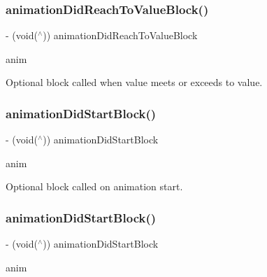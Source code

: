 \subsubsection{\texorpdfstring{animation\+Did\+Reach\+To\+Value\+Block()}{animationDidReachToValueBlock()}\hspace{0.1cm}{\footnotesize\ttfamily [2/2]}}
{\footnotesize\ttfamily -\/ (void($^\wedge$)) animation\+Did\+Reach\+To\+Value\+Block \begin{DoxyParamCaption}\item[{(\mbox{\hyperlink{interface_p_o_p_animation}{P\+O\+P\+Animation}} $\ast$)}]{anim }\end{DoxyParamCaption}}

Optional block called when value meets or exceeds to value. \mbox{\label{interface_p_o_p_animation_aa1e092d1ed9ba72340f8aefc71b8d817}} 
\subsubsection{\texorpdfstring{animation\+Did\+Start\+Block()}{animationDidStartBlock()}\hspace{0.1cm}{\footnotesize\ttfamily [1/2]}}
{\footnotesize\ttfamily -\/ (void($^\wedge$)) animation\+Did\+Start\+Block \begin{DoxyParamCaption}\item[{(\mbox{\hyperlink{interface_p_o_p_animation}{P\+O\+P\+Animation}} $\ast$)}]{anim }\end{DoxyParamCaption}}

Optional block called on animation start. \mbox{\label{interface_p_o_p_animation_aa1e092d1ed9ba72340f8aefc71b8d817}} 
\subsubsection{\texorpdfstring{animation\+Did\+Start\+Block()}{animationDidStartBlock()}\hspace{0.1cm}{\footnotesize\ttfamily [2/2]}}
{\footnotesize\ttfamily -\/ (void($^\wedge$)) animation\+Did\+Start\+Block \begin{DoxyParamCaption}\item[{(\mbox{\hyperlink{interface_p_o_p_animation}{P\+O\+P\+Animation}} $\ast$)}]{anim }\end{DoxyParamCaption}}

